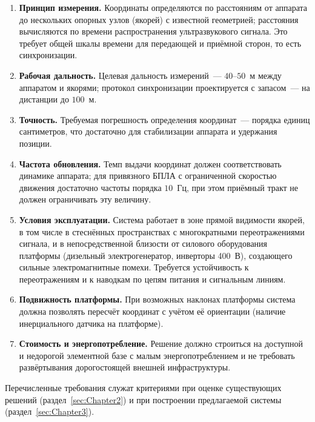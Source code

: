 \begin{enumerate}
  \item \textbf{Принцип измерения.} Координаты определяются по расстояниям от
        аппарата до нескольких опорных узлов (якорей) с известной геометрией;
        расстояния вычисляются по времени распространения ультразвукового сигнала.
        Это требует общей шкалы времени для передающей и приёмной сторон, то есть
        синхронизации.

  \item \textbf{Рабочая дальность.} Целевая дальность измерений~--- $40$--$50$~м между
        аппаратом и якорями; протокол
        синхронизации проектируется с запасом~--- на дистанции до $100$~м.

  \item \textbf{Точность.} Требуемая погрешность определения координат~--- порядка
        единиц сантиметров, что достаточно для стабилизации аппарата и удержания
        позиции.

  \item \textbf{Частота обновления.} Темп выдачи координат должен соответствовать
        динамике аппарата; для привязного БПЛА с ограниченной скоростью движения
        достаточно частоты порядка $10$~Гц, при этом приёмный тракт не должен
        ограничивать эту величину.

  \item \textbf{Условия эксплуатации.} Система работает в зоне прямой видимости
        якорей, в том числе в стеснённых пространствах с многократными
        переотражениями сигнала, и в непосредственной близости от силового
        оборудования платформы (дизельный электрогенератор, инверторы 400~В),
        создающего сильные электромагнитные помехи. Требуется устойчивость к
        переотражениям и к наводкам по цепям питания и сигнальным линиям.

  \item \textbf{Подвижность платформы.} При возможных наклонах платформы система
        должна позволять пересчёт координат с учётом её ориентации (наличие
        инерциального датчика на платформе).

  \item \textbf{Стоимость и энергопотребление.} Решение должно строиться на
        доступной и недорогой элементной базе с малым энергопотреблением и не
        требовать развёртывания дорогостоящей внешней инфраструктуры.
\end{enumerate}

Перечисленные требования служат критериями при оценке существующих решений
(раздел~\ref{sec:Chapter2}) и при построении предлагаемой системы
(раздел~\ref{sec:Chapter3}).
